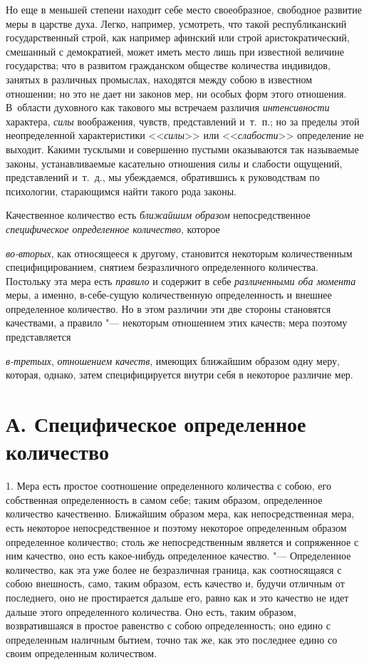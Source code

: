 Но еще в меньшей степени находит себе место своеобразное, свободное развитие
меры в царстве духа. Легко, например, усмотреть, что такой республиканский
государственный строй, как например афинский или строй аристократический,
смешанный с демократией, может иметь место лишь при известной величине
государства; что в развитом гражданском обществе количества индивидов,
занятых в различных промыслах, находятся между собою в известном отношении;
но это не дает ни законов мер, ни особых форм этого отношения. В~области
духовного как такового мы встречаем различия
{\em интенсивности} характера,
{\em силы} воображения, чувств, представлений и~т.~п.;
но за пределы этой неопределенной характеристики
<<{\em силы}>> или <<{\em слабости}>>
определение не выходит. Какими тусклыми и совершенно пустыми оказываются
так называемые законы, устанавливаемые касательно отношения силы и слабости
ощущений, представлений и~т.~д., мы убеждаемся, обратившись к руководствам
по психологии, старающимся найти такого рода законы.

Качественное количество есть {\em ближайшим образом} непосредственное
{\em специфическое определенное количество}, которое

{\em во-вторых}, как относящееся к другому, становится
некоторым количественным специфицированием, снятием безразличного
определенного количества. Постольку эта мера есть
{\em правило} и содержит в себе
{\em различенными оба момента} меры, а именно,
в-себе-сущую количественную определенность и внешнее определенное
количество. Но в этом различии эти две стороны становятся качествами, а
правило "--- некоторым отношением этих качеств; мера поэтому представляется

{\em в-третьих}, {\em отношением
качеств}, имеющих ближайшим образом одну меру, которая, однако, затем
специфицируется внутри себя в некоторое различие мер.

\section[А. Специфическое определенное количество]{А. Специфическое
определенное количество}

1. Мера есть простое соотношение определенного
количества с собою, его собственная определенность в самом себе; таким
образом, определенное количество качественно. Ближайшим образом мера, как
непосредственная мера, есть некоторое непосредственное и поэтому некоторое
определенным образом определенное количество; столь же непосредственным
является и сопряженное с ним качество, оно есть какое-нибудь определенное
качество. "--- Определенное количество, как эта уже более не безразличная
граница, как соотносящаяся с собою внешность, само, таким образом, есть
качество и, будучи отличным от последнего, оно не простирается дальше его,
равно как и это качество не идет дальше этого определенного количества. Оно
есть, таким образом, возвратившаяся в простое равенство с собою
определенность; оно едино с определенным наличным бытием, точно так же, как
это последнее едино со своим определенным количеством.

